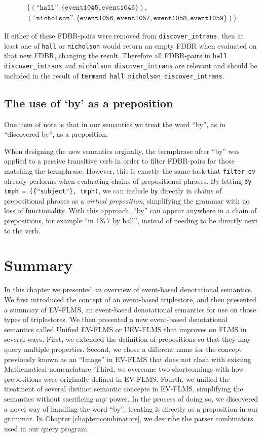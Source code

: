 \documentclass[../main.tex]{subfiles}
\begin{document}
\begin{gather*}
	\{ (\text{``}\mathtt{hall}\text{''}, \{ \mathtt{event1045}, \mathtt{event1046} \}), \\ (\text{``}\mathtt{nicholson}\text{''}, \{ \mathtt{event1056}, \mathtt{event1057}, \mathtt{event1058}, \mathtt{event1059} \}) \}
\end{gather*}

If either of these FDBR-pairs were removed from \texttt{discover\_intrans}, then at least one of \texttt{hall} or \texttt{nicholson} would return an empty FDBR when evaluated on that
new FDBR, changing the result.  Therefore all FDBR-pairs in \texttt{hall discover\_intrans} and \texttt{nicholson discover\_intrans} are relevant and should be included in the result of \texttt{termand hall nicholson discover\_intrans}.



\subsection{The use of `by' as a preposition}

One item of note is that in our semantics we treat the word ``by'', as in ``discovered by'', as a preposition.

When designing the new semantics orginally, the termphrase after ``by'' was
applied to a passive transitive verb in order to filter FDBR-pairs for those matching
the termphrase.  However, this is exactly the same task that \texttt{filter\_ev} already performs when evaluating chains of prepositional phrases.
By letting \texttt{by tmph = (\{"subject"\}, tmph)}, we can include \texttt{by}
directly in chains of prepositional phrases as a {\em virtual preposition}, simplifying the grammar
with no loss of functionality.  With this approach, ``by'' can appear anywhere in a chain of prepositions, for example ``in 1877 by hall'', instead
of needing to be directly next to the verb.

\section{Summary}

In this chapter we presented an overview of event-based denotational semantics.  We first introduced the concept of an event-based triplestore,
and then presented a summary of EV-FLMS, an event-based denotational semantics for use on those types of triplestores.  We then presented a new
event-based denotational semantics called Unified EV-FLMS or UEV-FLMS that improves on FLMS in several ways.  First, we extended the definition of prepositions
so that they may query multiple properties.  Second, we chose a different name for the concept previously known as an ``Image'' in EV-FLMS that does not clash
with existing Mathematical nomenclature.  Third, we overcame two shortcomings with how prepositions were originally defined in EV-FLMS.  Fourth, we unified
the treatment of several distinct semantic concepts in EV-FLMS, simplifying the semantics without sacrificing any power.  In the process of doing so, we discovered
a novel way of handling the word ``by'', treating it directly as a preposition in our grammar.  In Chapter \ref{chapter:combinators}, we describe the parser
combinators used in our query program.
\end{document}
